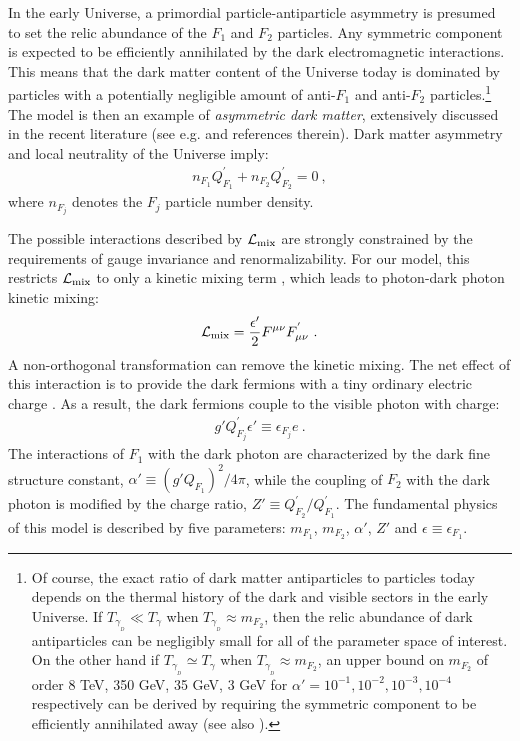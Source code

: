 \documentclass[12pt]{article}
\begin{document}
In the early Universe, a primordial particle-antiparticle
asymmetry is presumed to set the relic abundance of the
$F_1$ and $F_2$ particles. Any symmetric component is expected to be efficiently annihilated by the dark electromagnetic interactions. This means that the dark matter content of the Universe today is dominated by particles with a potentially negligible amount of anti-$F_1$ and anti-$F_2$ particles.\footnote{Of course, the exact ratio of dark matter antiparticles to particles today depends on the thermal history of the dark and visible sectors in the early Universe. If $T _{\gamma _{_D}} \ll T _{\gamma}$ when $T _{\gamma _{_D}} \approx m _{F_2}$, then the relic abundance of dark antiparticles can be negligibly small for all of the parameter space of interest.  On the other hand if $T _{\gamma _{_D}} \simeq T _{\gamma}$ when $T _{\gamma _{_D}} \approx m _{F_2}$, an upper bound on $m _{F_2}$ of order 8 TeV, 350 GeV, 35 GeV, 3 GeV for $\alpha ' = 10 ^{-1}, 10 ^{-2}, 10 ^{-3}, 10 ^{-4}$ respectively can be derived by requiring the symmetric component to be efficiently annihilated away \cite{petrakinew} (see also \cite{vecchi,vonharling}).} The model is then an example of \textit{asymmetric dark matter}, extensively discussed in the recent literature (see e.g. \cite{asymmetric} and references therein). Dark matter asymmetry and local neutrality of the Universe imply:
%
\begin{eqnarray}
n _{F_1}Q ^{'} _{F_1} + n _{F_2}Q ^{'} _{F_2} = 0 \ ,
\label{asymmetry}
\end{eqnarray}
%
where $n _{F_j}$ denotes the $F_j$ particle number density.

The possible interactions described by ${\cal L} _{\text{mix}}$ are strongly constrained by the requirements of gauge invariance and renormalizability. For our model, this restricts ${\cal L} _{\text{mix}}$ to only a kinetic mixing term \cite{foothe}, which leads to photon-dark photon kinetic mixing:
%
\begin{eqnarray}
{\cal L} _{\text{mix}} = \frac{\epsilon '}{2}F ^{\mu \nu}F ^{'} _{\mu \nu} \ .
\end{eqnarray}
%
A non-orthogonal transformation can remove the kinetic mixing. The net effect of this interaction is to provide the dark fermions with a tiny ordinary electric charge \cite{holdom}. As a result, the dark fermions couple to the visible photon with charge:
%
\begin{eqnarray}
g'Q ^{'} _{F_j}\epsilon ' \equiv \epsilon _{F_j}e \ .
\end{eqnarray}
%
The interactions of $F_1$ with the dark photon are characterized by the dark fine structure constant, $\alpha ' \equiv (g'Q _{F_1})^2/4\pi$, while the coupling of $F_2$ with the dark photon is modified by the charge ratio, $Z' \equiv Q ^{'} _{F_2}/Q ^{'} _{F_1}$. The fundamental physics of this model is described by five parameters: $m _{F_1}$, $m _{F_2}$, $\alpha '$, $Z'$ and $\epsilon \equiv \epsilon _{F_1}$.
\end{document}
